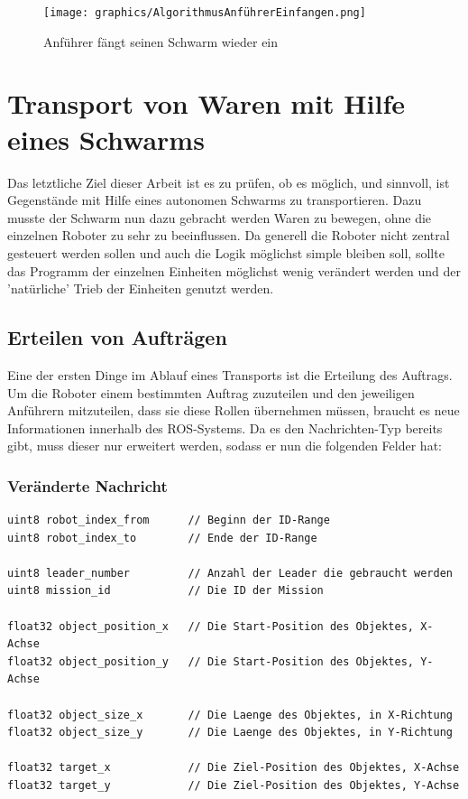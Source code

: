 \begin{figure}
	\texttt{[image: graphics/AlgorithmusAnführerEinfangen.png]}
	\caption{Anführer fängt seinen Schwarm wieder ein}
	\label{pic:AnführerEinfangen}
\end{figure}







\section{Transport von Waren mit Hilfe eines Schwarms}

Das letztliche Ziel dieser Arbeit ist es zu prüfen, ob es möglich, und sinnvoll, ist Gegenstände mit Hilfe eines autonomen Schwarms zu transportieren. Dazu musste der Schwarm nun dazu gebracht werden Waren zu bewegen, ohne die einzelnen Roboter zu sehr zu beeinflussen. Da generell die Roboter nicht zentral gesteuert werden sollen und auch die Logik möglichst simple bleiben soll, sollte das Programm der einzelnen Einheiten möglichst wenig verändert werden und der 'natürliche' Trieb der Einheiten genutzt werden.

\subsection*{Erteilen von Aufträgen}

Eine der ersten Dinge im Ablauf eines Transports ist die Erteilung des Auftrags. Um die Roboter einem bestimmten Auftrag zuzuteilen und den jeweiligen Anführern mitzuteilen, dass sie diese Rollen übernehmen müssen, braucht es neue Informationen innerhalb des \ac{ROS}-Systems. Da es den Nachrichten-Typ  bereits gibt, muss dieser nur erweitert werden, sodass er nun die folgenden Felder hat:


\subsubsection*{Veränderte Nachricht}

\begin{lstlisting}[style=ros, title=Nachrichten-Typ: New\_Mission.msg]
uint8 robot_index_from		// Beginn der ID-Range
uint8 robot_index_to		// Ende der ID-Range

uint8 leader_number			// Anzahl der Leader die gebraucht werden
uint8 mission_id			// Die ID der Mission

float32 object_position_x	// Die Start-Position des Objektes, X-Achse
float32 object_position_y	// Die Start-Position des Objektes, Y-Achse

float32 object_size_x		// Die Laenge des Objektes, in X-Richtung
float32 object_size_y		// Die Laenge des Objektes, in Y-Richtung

float32 target_x			// Die Ziel-Position des Objektes, X-Achse
float32 target_y			// Die Ziel-Position des Objektes, Y-Achse
\end{lstlisting}

